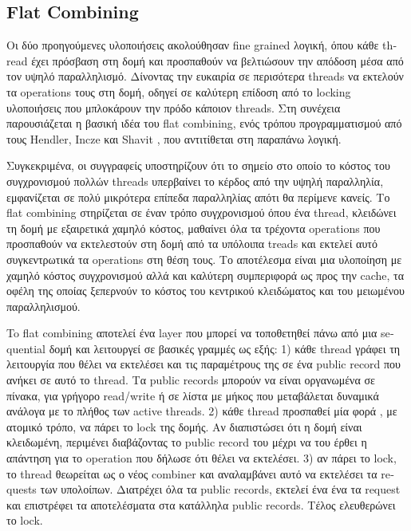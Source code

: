 \subsection{\textlatin{Flat Combining}}

Οι δύο προηγούμενες υλοποιήσεις ακολούθησαν \textlatin{fine grained} λογική, όπου κάθε \textlatin{thread} έχει πρόσβαση στη δομή και προσπαθούν να βελτιώσουν την απόδοση μέσα από τον υψηλό παραλληλισμό. Δίνοντας την ευκαιρία σε περισότερα threads να εκτελούν τα operations τους στη δομή, οδηγεί σε καλύτερη επίδοση από το \textlatin{locking} υλοποιήσεις που μπλοκάρουν την πρόδο κάποιον \textlatin{threads}. Στη συνέχεια παρουσιάζεται η βασική ιδέα του \textlatin{flat combining}, ενός τρόπου προγραμματισμού από τους \textlatin{Hendler, Incze} και \textlatin{Shavit} \cite{flat_combining}, που αντιτίθεται στη παραπάνω λογική. 

Συγκεκριμένα, οι συγγραφείς υποστηρίζουν ότι το σημείο στο οποίο το κόστος του συγχρονισμού πολλών \textlatin{threads} υπερβαίνει το κέρδος από την υψηλή παραλληλία, εμφανίζεται σε πολύ μικρότερα επίπεδα παραλληλίας απότι θα περίμενε κανείς. Το \textlatin{flat combining} στηρίζεται σε έναν τρόπο συγχρονισμού όπου ένα \textlatin{thread}, κλειδώνει τη δομή με εξαιρετικά χαμηλό κόστος, μαθαίνει όλα τα τρέχοντα \textlatin{operations} που προσπαθούν να εκτελεστούν στη δομή από τα υπόλοιπα \textlatin{treads} και εκτελεί αυτό συγκεντρωτικά τα \textlatin{operations} στη θέση τους. Το αποτέλεσμα είναι μια υλοποίηση με χαμηλό κόστος συγχρονισμού αλλά και καλύτερη συμπεριφορά ως προς την \textlatin{cache}, τα οφέλη της οποίας ξεπερνούν το κόστος του κεντρικού κλειδώματος και του μειωμένου παραλληλισμού.

To \textlatin{flat combining} αποτελεί ένα \textlatin{layer} που μπορεί να τοποθετηθεί πάνω από μια \textlatin{sequential} δομή και λειτουργεί σε βασικές γραμμές ως εξής:
1) κάθε \textlatin{thread} γράφει τη λειτουργία που θέλει να εκτελέσει και τις παραμέτρους της σε ένα \textlatin{public record} που ανήκει σε αυτό το \textlatin{thread}. Τα \textlatin{public records} μπορούν να είναι οργανωμένα σε πίνακα, για γρήγορο \textlatin{read/write} ή σε λίστα με μήκος που μεταβάλεται δυναμικά ανάλογα με το πλήθος των \textlatin{active threads}.
2) κάθε \textlatin{thread} προσπαθεί μία φορά , με ατομικό τρόπο, να πάρει το \textlatin{lock} της δομής. Αν διαπιστώσει ότι η δομή είναι κλειδωμένη, περιμένει διαβάζοντας το \textlatin{public record} του μέχρι να του έρθει η απάντηση για το \textlatin{operation} που δήλωσε ότι θέλει να εκτελέσει.
3) αν πάρει το \textlatin{lock}, το \textlatin{thread} θεωρείται ως ο νέος \textlatin{combiner} και αναλαμβάνει αυτό να εκτελέσει τα \textlatin{requests} των υπολοίπων. Διατρέχει όλα τα \textlatin{public records}, εκτελεί ένα ένα τα \textlatin{request} και επιστρέφει τα αποτελέσματα στα κατάλληλα \textlatin{public records}. Τέλος ελευθερώνει το \textlatin{lock}.

